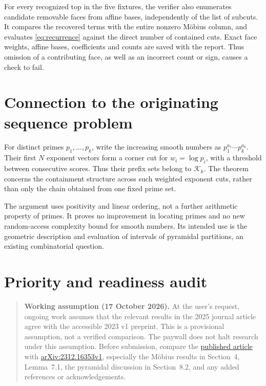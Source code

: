 \documentclass[11pt]{article}
\theoremstyle{remark}
\newcommand{\K}{\mathcal K}
\begin{document}
For every recognized top in the five fixtures, the verifier also enumerates
candidate removable faces from affine bases, independently of the list of
subcuts. It compares the recovered terms with the entire nonzero M\"obius
column, and evaluates \eqref{eq:recurrence} against the direct number of
contained cuts. Exact face weights, affine bases, coefficients and counts
are saved with the report. Thus omission of a contributing face, as well
as an incorrect count or sign, causes a check to fail.

\section{Connection to the originating sequence problem}

For distinct primes $p_1,\ldots,p_k$, write the increasing smooth numbers
as $p_1^{a_1}\cdots p_k^{a_k}$. Their first $N$ exponent vectors form
a corner cut for $w_i=\log p_i$, with a threshold between consecutive
scores. Thus their prefix sets belong to $\K_k$. The theorem concerns
the containment structure across such weighted exponent cuts, rather than
only the chain obtained from one fixed prime set.

The argument uses positivity and linear ordering, not a further arithmetic
property of primes. It proves no improvement in locating primes and no
new random-access complexity bound for smooth numbers. Its intended use
is the geometric description and evaluation of intervals of pyramidal
partitions, an existing combinatorial question.

\section*{Priority and readiness audit}

\begin{quote}
\small\textbf{Working assumption (17 October 2026).}
At the user's request, ongoing work assumes that the relevant results in the
2025 journal article agree with the accessible 2023 v1 preprint. This is a
provisional assumption, not a verified comparison. The paywall does not halt
research under this assumption. Before submission, compare the
\href{https://doi.org/10.1016/j.aam.2024.102807}{published article}
with \href{https://arxiv.org/abs/2312.16353v1}{arXiv:2312.16353v1},
especially the M\"obius results in Section~4, Lemma~7.1, the pyramidal
discussion in Section~8.2, and any added references or acknowledgements.
\end{quote}
\end{document}
